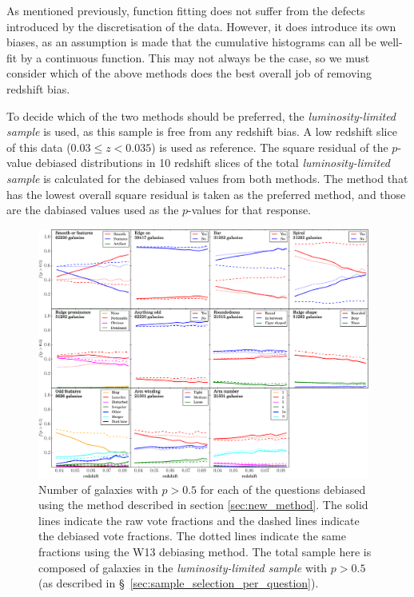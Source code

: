 \documentclass[useAMS,usenatbib]{mn2e}
\begin{document}
As mentioned previously, function fitting does not suffer from the defects introduced by the discretisation of the data. However, it does introduce its own biases, as an assumption is made that the cumulative histograms can all be well-fit by a continuous function. This may not always be the case, so we must consider which of the above methods does the best overall job of removing redshift bias. 

To decide which of the two methods should be preferred, the \textit{luminosity-limited sample} is used, as this sample is free from any redshift bias. A low redshift slice of this data ($0.03 \leq z < 0.035$) is used as reference. The square residual of the $p$-value debiased distributions in 10 redshift slices of the total \textit{luminosity-limited sample} is calculated for the debiased values from both methods. The method that has the lowest overall square residual is taken as the preferred method, and those are the dabiased values used as the $p$-values for that response.

\begin{figure}
		\centering

        \includegraphics[width=0.975\textwidth]{Images/Bias/Debiasing/all_thresholds.pdf}

        \caption{Number of galaxies with $p>0.5$ for each of the questions debiased using the method described in section \ref{sec:new_method}. The solid lines indicate the raw vote fractions and the dashed lines indicate the debiased vote fractions. The dotted lines indicate the same fractions using the W13 debiasing method. The total sample here is composed of galaxies in the \textit{luminosity-limited sample} with $p>0.5$ (as described in \S~\ref{sec:sample_selection_per_question}).}

        \label{fig:all_thresholds}

\end{figure}
\end{document}

